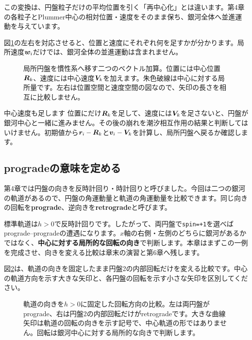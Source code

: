 この変換は、円盤粒子だけの平均位置を引く「再中心化」とは違います。第4章の各粒子とPlummer中心の相対位置・速度をそのまま保ち、銀河全体へ並進運動を与えています。


図\ref{fig:concept-ch5-frame}の左右を対応させると、位置と速度にそれぞれ何を足すかが分かります。局所速度$\boldsymbol{w}_i$だけでは、銀河全体の並進運動は含まれません。
\begin{figure}[!htbp]
\centering

\caption{局所円盤を慣性系へ移す二つのベクトル加算。位置には中心位置$\boldsymbol R_k$、速度には中心速度$\boldsymbol V_k$を加えます。朱色破線は中心に対する局所量です。左右は位置空間と速度空間の図なので、矢印の長さを相互に比較しません。}
\label{fig:concept-ch5-frame}
\end{figure}
\FloatBarrier

\begin{failbox}{中心速度も足します}
位置にだけ$\boldsymbol R_k$を足して、速度には$\boldsymbol V_k$を足さないと、円盤が銀河中心と一緒に進みません。その後の崩れを潮汐相互作用の結果と判断してはいけません。初期値から$\boldsymbol r_i-\boldsymbol R_k$と$\boldsymbol v_i-\boldsymbol V_k$を計算し、局所円盤へ戻るか確認します。
\end{failbox}

\subsection{progradeの意味を定める}
第4章では円盤の向きを反時計回り・時計回りと呼びました。今回は二つの銀河の軌道があるので、円盤の角運動量と軌道の角運動量を比較できます。同じ向きの回転を\textbf{prograde}、逆向きを\textbf{retrograde}と呼びます。

標準軌道は$h>0$で反時計回りです。したがって、両円盤で\texttt{spin=+1}を選べばprograde--progradeの遭遇になります。$x$軸の右側・左側のどちらに銀河があるかではなく、\textbf{中心に対する局所的な回転の向き}で判断します。本章はまずこの一例を完成させ、向きを変える比較は章末の演習と第6章へ残します。


図\ref{fig:concept-ch5-spin}は、軌道の向きを固定したまま円盤2の内部回転だけを変える比較です。中心の軌道方向を示す大きな矢印と、各円盤の回転を示す小さな矢印を区別してください。
\begin{figure}[!htbp]
\centering

\caption{軌道の向きを$h>0$に固定した回転方向の比較。左は両円盤がprograde、右は円盤2の内部回転だけがretrogradeです。大きな曲線矢印は軌道の回転の向きを示す記号で、中心軌道の形ではありません。回転は銀河中心に対する局所的な向きで判断します。}
\label{fig:concept-ch5-spin}
\end{figure}
\FloatBarrier

